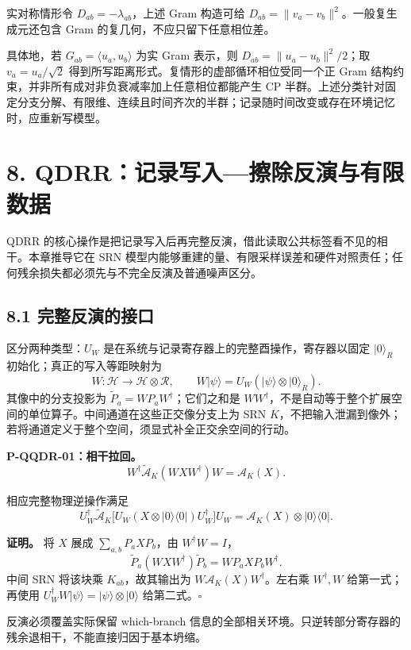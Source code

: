 \documentclass[
  11pt,
  oneside]{book}
\begin{document}
实对称情形令 \(D_{ab}=-\lambda_{ab}\)，上述 Gram 构造可给
\(D_{ab}=\|v_a-v_b\|^2\)。一般复生成元还包含 Gram
的复几何，不应只留下任意相位差。

具体地，若 \(G_{ab}=\langle u_a,u_b\rangle\) 为实 Gram 表示，则
\(D_{ab}=\|u_a-u_b\|^2/2\)；取 \(v_a=u_a/\sqrt2\)
得到所写距离形式。复情形的虚部循环相位受同一个正 Gram
结构约束，并非所有成对非负衰减率加上任意相位都能产生 CP
半群。上述分类针对固定分支分解、有限维、连续且时间齐次的半群；记录随时间改变或存在环境记忆时，应重新写模型。

\chapter{8. QDRR：记录写入---擦除反演与有限数据}\label{ch-8}\hypertarget{ch-8}{}

QDRR
的核心操作是把记录写入后再完整反演，借此读取公共标签看不见的相干。本章推导它在
SRN
模型内能够重建的量、有限采样误差和硬件对照责任；任何残余损失都必须先与不完全反演及普通噪声区分。

\section{8.1 完整反演的接口}

区分两种类型：\(U_W\) 是在系统与记录寄存器上的完整酉操作，寄存器以固定
\(|0\rangle_R\) 初始化；真正的写入等距映射为 \[
W:\mathcal H\to\mathcal H\otimes\mathcal R,\qquad
W|\psi\rangle=U_W(|\psi\rangle\otimes|0\rangle_R).
\] 其像中的分支投影为 \(\widetilde P_a=WP_aW^\dagger\)；它们之和是
\(WW^\dagger\)，不是自动等于整个扩展空间的单位算子。中间通道在这些正交像分支上为
SRN
\(K\)，不把输入泄漏到像外；若将通道定义于整个空间，须显式补全正交余空间的行动。

\protect\hypertarget{p-qqdr-01}{}{}

\textbf{P-QQDR-01：相干拉回。} \[
W^\dagger\widetilde{\mathcal A}_K(WXW^\dagger)W=\mathcal A_K(X).
\]

相应完整物理逆操作满足 \[
U_W^\dagger\widetilde{\mathcal A}_K
\bigl[U_W(X\otimes|0\rangle\langle0|)U_W^\dagger\bigr]U_W
=\mathcal A_K(X)\otimes|0\rangle\langle0|.
\]

\textbf{证明。} 将 \(X\) 展成 \(\sum_{a,b}P_aXP_b\)，由
\(W^\dagger W=I\)， \[
\widetilde P_a(WXW^\dagger)\widetilde P_b=WP_aXP_bW^\dagger.
\] 中间 SRN 将该块乘 \(K_{ab}\)，故其输出为
\(W\mathcal A_K(X)W^\dagger\)。左右乘 \(W^\dagger,W\) 给第一式；再使用
\(U_W^\dagger W|\psi\rangle=|\psi\rangle\otimes|0\rangle\)
给第二式。\(\square\)

反演必须覆盖实际保留 which-branch
信息的全部相关环境。只逆转部分寄存器的残余退相干，不能直接归因于基本坍缩。
\end{document}
